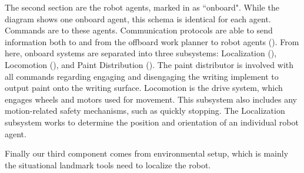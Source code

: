 The second section are the robot agents, marked in  as ``onboard". While the diagram shows one onboard agent, this schema is identical for each agent. Commands are  to these agents.  Communication protocols are able to send information both to and from the offboard work planner to robot agents (). From here, onboard systems are separated into three subsystems: Localization (), Locomotion (), and Paint Distribution (). The paint distributor is involved with all commands regarding engaging and disengaging the writing implement to output paint onto the writing surface. Locomotion is the drive system, which engages wheels and motors used for movement. This subsystem also includes any motion-related safety mechanisms, such as quickly stopping. The Localization subsystem works to determine the position and orientation of an individual robot agent.

Finally our third component comes from environmental setup, which is mainly the situational landmark tools need to localize the robot.